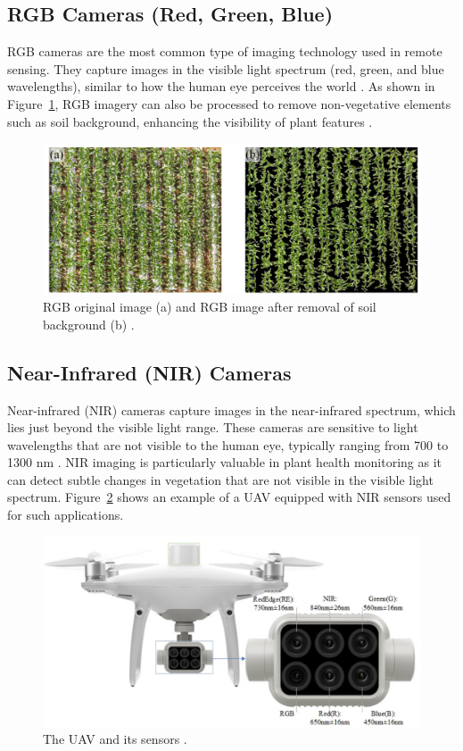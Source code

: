 \subsection{RGB Cameras (Red, Green, Blue)}
RGB cameras are the most common type of imaging technology used in remote sensing. They capture images in the visible light spectrum (red, green, and blue wavelengths), similar to how the human eye perceives the world \parencite{delavarpour2021technical}. As shown in Figure~\ref{fig:RGBbackground}, RGB imagery can also be processed to remove non-vegetative elements such as soil background, enhancing the visibility of plant features \parencite{li2024monitoring}.

\begin{figure}[H]
    \centering
    \includegraphics[width=0.6
    \textwidth]{chapters/chapter3/images/Figure02.png}
    \caption{RGB original image (a) and RGB image after removal of soil background (b) \protect\parencite{li2024monitoring}.}
    \label{fig:RGBbackground}
\end{figure}

\subsection{Near-Infrared (NIR) Cameras}

Near-infrared (NIR) cameras capture images in the near-infrared spectrum, which lies just beyond the visible light range. These cameras are sensitive to light wavelengths that are not visible to the human eye, typically ranging from 700 to 1300 nm \parencite{delavarpour2021technical}. NIR imaging is particularly valuable in plant health monitoring as it can detect subtle changes in vegetation that are not visible in the visible light spectrum. Figure~\ref{fig:UAVsensors} shows an example of a UAV equipped with NIR sensors used for such applications.


\begin{figure}[H]
    \centering
    \includegraphics[width=0.6
    \textwidth]{chapters/chapter3/images/Figure03.png}
    \caption{The UAV and its sensors \protect\parencite{li2024monitoring}.}
    \label{fig:UAVsensors}
\end{figure}


